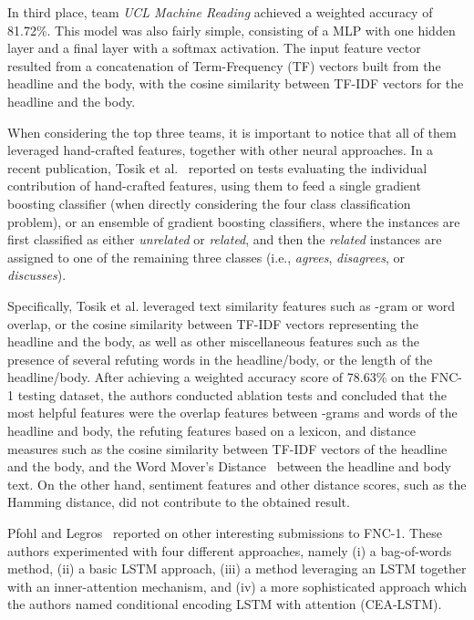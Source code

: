 In third place, team \textit{UCL Machine Reading} \cite{riedel2017simple} achieved a weighted accuracy of 81.72\%. This model was also fairly simple, consisting of a MLP with one hidden layer and a final layer with a softmax activation. The input feature vector resulted from a concatenation of Term-Frequency (TF) vectors built from the headline and the body, with the cosine similarity between TF-IDF vectors for the headline and the body.

When considering the top three teams, it is important to notice that all of them leveraged hand-crafted features, together with other neural approaches. In a recent publication, Tosik et al.~\cite{tosikdebunking} reported on tests evaluating the individual contribution of hand-crafted features, using them to feed a single gradient boosting classifier (when directly considering the four class classification problem), or an ensemble of gradient boosting classifiers, where the instances are first classified as either \textit{unrelated} or \textit{related}, and then the \textit{related} instances are assigned to one of the remaining three classes (i.e., \textit{agrees}, \textit{disagrees}, or \textit{discusses}).

Specifically, Tosik et al. leveraged text similarity features such as -gram or word overlap, or the cosine similarity between TF-IDF vectors representing the headline and the body, as well as other miscellaneous features such as the presence of several refuting words in the headline/body, or the length of the headline/body. After achieving a weighted accuracy score of 78.63\% on the FNC-1 testing dataset, the authors conducted ablation tests and concluded that the most helpful features were the overlap features between -grams and words of the headline and body, the refuting features based on a lexicon, and distance measures such as the cosine similarity between TF-IDF vectors of the headline and the body, and the Word Mover's Distance~\cite{wmd} between the headline and body text. On the other hand, sentiment features and other distance scores, such as the Hamming distance, did not contribute to the obtained result.

Pfohl and Legros~\cite{stanfordattention} reported on other interesting submissions to FNC-1. These authors experimented with four different approaches, namely (i) a bag-of-words method, (ii) a basic LSTM approach, (iii) a method leveraging an LSTM together with an inner-attention mechanism, and (iv) a more sophisticated approach which the authors named conditional encoding LSTM with attention (CEA-LSTM).  

